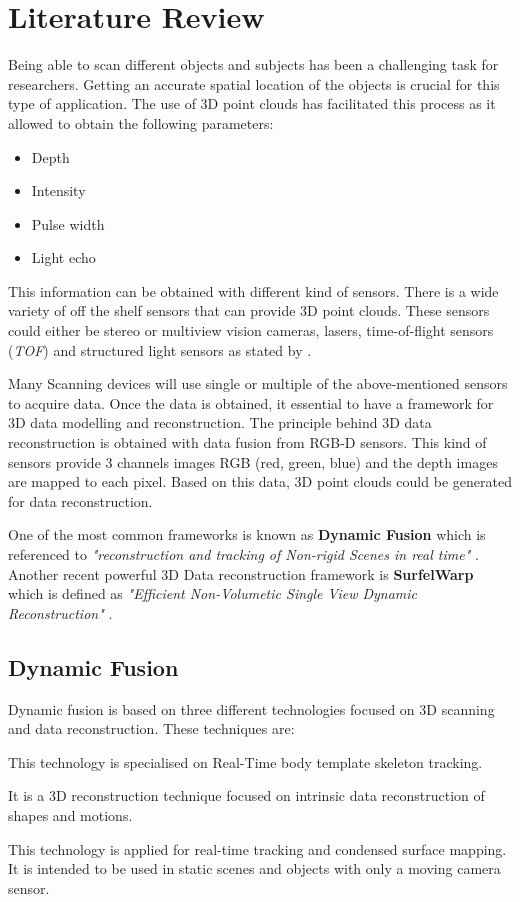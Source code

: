 \documentclass[12pt]{report}
\begin{document}
\chapter{Literature Review}
Being able to scan different objects and subjects has been a challenging task for researchers. Getting an accurate spatial location of the objects is crucial for this type of application.
The use of 3D point clouds has facilitated this process as it allowed to obtain the following parameters:
\begin{itemize}[]
  \itemsep0em 
  \item Depth
  \item Intensity
  \item Pulse width
  \item Light echo
\end{itemize}
This information can be obtained with different kind of sensors. There is a wide variety of off the shelf sensors that can provide 3D point clouds. 
These sensors could either be stereo or multiview vision cameras, lasers, time-of-flight sensors (\textit{TOF}) and structured light sensors as stated by .

Many Scanning devices will use single or multiple of the above-mentioned sensors to acquire data. Once the data is obtained, it essential to have a framework for 3D data modelling and reconstruction.
The principle behind 3D data reconstruction is obtained with data fusion from RGB-D sensors. This kind of sensors provide 3 channels images RGB (red, green, blue) and the depth images are mapped to each pixel. Based on this data, 3D point clouds could be generated for data reconstruction.

One of the most common frameworks is known as \textbf{Dynamic Fusion} which is referenced to \textit{"reconstruction and tracking of Non-rigid Scenes in real time"} .
Another recent powerful 3D Data reconstruction framework is \textbf{SurfelWarp} which is defined as \textit{"Efficient Non-Volumetic Single View Dynamic Reconstruction"} .

\section{Dynamic Fusion}
Dynamic fusion is based on three different technologies focused on 3D scanning and data reconstruction. These techniques are: 

\begin{description}[style=nextline]
  \item[DART (Dense Articulated Real-Time Tracking)] This technology is specialised on Real-Time body template skeleton tracking.
  \item[Animation Cartography] It is a 3D reconstruction technique focused on intrinsic data reconstruction of shapes and motions. 
  \item[Kinect Fusion] This technology is applied for real-time tracking and condensed surface mapping. It is intended to be used in static scenes and objects with only a moving camera sensor. 
\end{description} 
\end{document}
